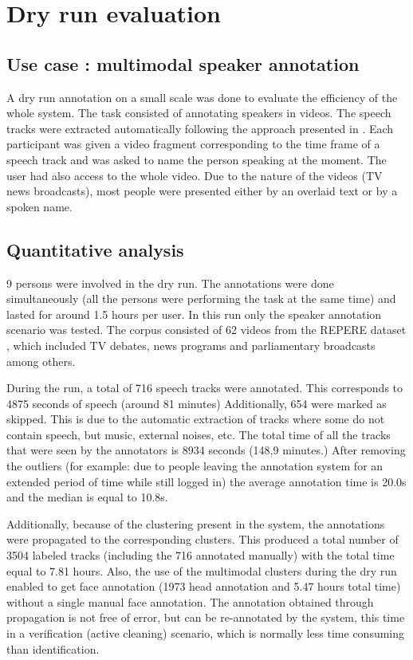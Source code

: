 \documentclass[a4paper]{article}
\begin{document}
  \section{Dry run evaluation}
      \subsection{Use case : multimodal speaker annotation}
     

A dry run annotation on a small scale was done to evaluate the efficiency of the whole system. The task consisted of annotating speakers in videos. The speech tracks were extracted automatically following the approach presented in \cite{barras2006multistage}.
Each participant was given a video fragment corresponding to the time frame of a speech track and was asked to name the person speaking at the moment.
The user had also access to the whole video. Due to the nature of the videos (TV news broadcasts), most people were presented either by an overlaid text or by a spoken name.
 
      
      \subsection{Quantitative analysis}
 
9 persons were involved in the dry run. The annotations were done simultaneously (all the persons were performing the task at the same time) and lasted for around 1.5 hours per user.
In this run only the speaker annotation scenario was tested. The corpus consisted of 62 videos from the REPERE dataset \cite{giraudel2012repere}, which included TV debates, news programs and parliamentary broadcasts among others.  

During the run, a total of 716 speech tracks were annotated. This corresponds to 4875 seconds of speech (around 81 minutes) Additionally, 654 were marked as skipped. This is due to the automatic extraction of tracks where some do not contain speech, but music, external noises, etc. The total time of all the tracks that were seen by the annotators is 8934 seconds (148,9 minutes.)
After removing the outliers (for example: due to people leaving the annotation system for an extended period of time while still logged in) the average annotation time is 20.0s and the median is equal to 10.8s.

Additionally, because of the clustering present in the system, the annotations were propagated to the corresponding clusters. This produced a total number of 3504 labeled tracks (including the 716 annotated manually) with the total time equal to 7.81 hours. Also, the use of the multimodal clusters during the dry run enabled to get face annotation (1973 head annotation and 5.47 hours total time)
without a single manual face annotation. The annotation obtained through propagation is not free of error, but can be re-annotated by the system, this time in a verification (active cleaning) scenario, which is normally less time consuming than identification.
\end{document}
